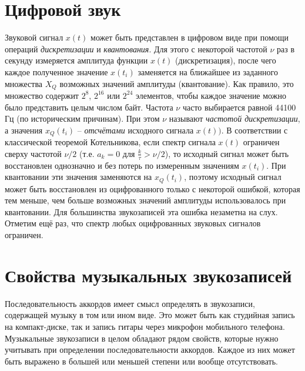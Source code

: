 \section{Цифровой звук} \label{sectT_digit}

Звуковой сигнал $x(t)$ может быть представлен в цифровом виде при помощи
операций \emph{дискретизации} и \emph{квантования}. Для этого с некоторой
частотой $\nu$ раз в секунду измеряется амплитуда функции $x(t)$
(дискретизация), после чего каждое полученное значение $x(t_i)$ заменяется на
ближайшее из заданного множества $X_Q$ возможных значений амплитуды
(квантование). Как правило, это множество содержит $2^8$, $2^{16}$ или $2^{24}$
элементов, чтобы каждое значение можно было представить целым числом байт.
Частота $\nu$ часто выбирается равной 44100 Гц (по историческим причинам). При
этом $\nu$ называют \emph{частотой дискретизации}, а значения $x_Q(t_i)$ --
\emph{отсчётами} исходного сигнала $x(t))$. В соответствии с классической
теоремой Котельникова, если спектр сигнала $x(t)$ ограничен сверху частотой
$\nu/2$ (т.е. $a_k = 0$ для $\frac{k}{\tau} > \nu/2$), то исходный сигнал может
быть восстановлен однозначно и без потерь по измеренным значениям $x(t_i)$. При
квантовании эти значения заменяются на $x_Q(t_i)$, поэтому исходный сигнал может
быть восстановлен из оцифрованного только с некоторой ошибкой, которая тем
меньше, чем больше возможных значений амплитуды использовалось при квантовании.
Для большинства звукозаписей эта ошибка незаметна на слух. Отметим ещё раз, что
спектр любых оцифрованных звуковых сигналов ограничен.

\section{Свойства музыкальных звукозаписей} \label{sectT_musrec}

Последовательность аккордов имеет смысл определять в звукозаписи, содержащей
музыку в том или ином виде. Это может быть как студийная запись на
компакт-диске, так и запись гитары через микрофон мобильного телефона.
Музыкальные звукозаписи в целом обладают рядом свойств, которые нужно учитывать
при определении последовательности аккордов. Каждое из них может быть выражено
в большей или меньшей степени или вообще отсутствовать.

